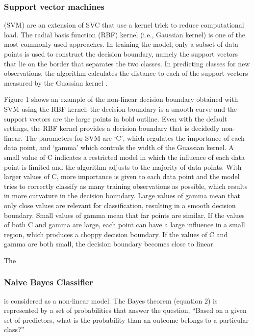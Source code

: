 \documentclass[sigconf]{acmart}
\begin{document}

\subsubsection{Support vector machines} (SVM) are an extension of SVC that use a 
kernel trick to reduce computational load. The radial basis function (RBF) 
kernel (i.e., Gaussian kernel) is one of the most commonly used approaches. 
In training the model, only a subset of data points is used to construct the 
decision boundary, namely the support vectors that lie on the border that 
separates the two classes. In predicting classes for new observations, the 
algorithm calculates the distance to each of the support vectors measured 
by the Guassian kernel \cite{muller17}. 

Figure 1 shows an example of the 
non-linear decision boundary obtained with SVM using the RBF kernel; the 
decision boundary is a smooth curve and the support vectors are the large 
points in bold outline. Even with the default settings, the RBF kernel 
provides a decision boundary that is decidedly non-linear. The parameters 
for SVM are `C', which regulates the importance of each data point, and 
`gamma' which controls the width of the Guassian kernel. A small value of 
C indicates a restricted model in which the influence of each data point is 
limited and the algorithm adjusts to the majority of data points. With larger 
values of C, more importance is given to each data point and the model tries 
to correctly classify as many training observations as possible, which results 
in more curvature in the decision boundary. Large values of gamma mean that 
only close values are relevant for classification, resulting in a smooth 
decision boundary. Small values of gamma mean that far points are similar. 
If the values of both C and gamma are large, each point can have a large 
influence in a small region, which produces a choppy decision boundary. 
If the values of C and gamma are both small, the decision boundary becomes 
close to linear.



The \subsubsection{Naive Bayes Classifier} is considered as a non-linear model.
The Bayes theorem (equation 2) is represented by a set of probabilities 
that answer the question, ``Based on a given set of predictors, 
what is the probability than an outcome belongs to a particular class?''
\end{document}
